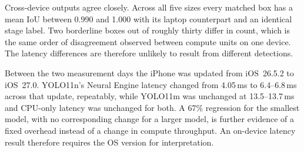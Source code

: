 Cross-device outputs agree closely. Across all five sizes every matched box has
a mean IoU between 0.990 and 1.000 with its laptop counterpart and an identical
stage label. Two borderline boxes out of roughly thirty differ in count, which
is the same order of disagreement observed between compute units on one device.
The latency differences are therefore unlikely to result from different
detections.

Between the two measurement days the iPhone was updated from iOS~26.5.2 to
iOS~27.0. YOLO11n's Neural Engine latency changed from 4.05\,ms to
6.4--6.8\,ms across that update, repeatably, while YOLO11m was unchanged at
13.5--13.7\,ms and CPU-only latency was unchanged for both. A 67\% regression
for the smallest model, with no corresponding change for a larger model, is
further evidence of a fixed overhead instead of a change in compute throughput.
An on-device latency result therefore requires the OS version for
interpretation.
